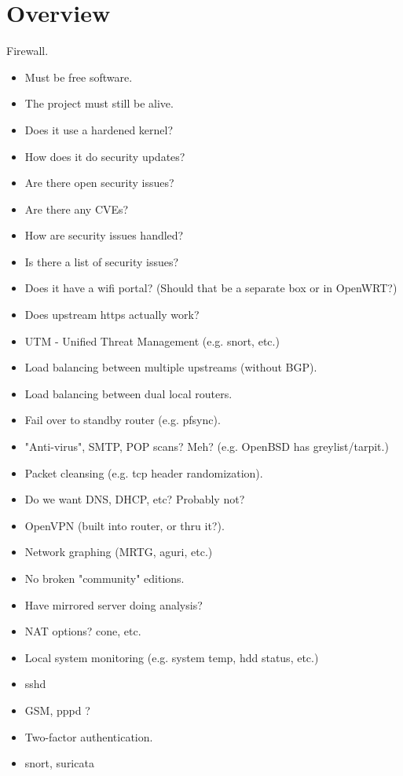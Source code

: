 %
%
%
%
%

\section{Overview}
Firewall.

\begin{itemize}
 \item Must be free software.
 \item The project must still be alive.
 \item Does it use a hardened kernel?
 \item How does it do security updates?
 \item Are there open security issues?
 \item Are there any CVEs?
 \item How are security issues handled?
 \item Is there a list of security issues?
 \item Does it have a wifi portal? (Should that be a separate box or in OpenWRT?)
 \item Does upstream https actually work?
 \item UTM - Unified Threat Management (e.g. snort, etc.)
 \item Load balancing between multiple upstreams (without BGP).
 \item Load balancing between dual local routers.
 \item Fail over to standby router (e.g. pfsync).
 \item "Anti-virus", SMTP, POP scans? Meh? (e.g. OpenBSD has greylist/tarpit.)
 \item Packet cleansing (e.g. tcp header randomization).
 \item Do we want DNS, DHCP, etc? Probably not?
 \item OpenVPN (built into router, or thru it?).
 \item Network graphing (MRTG, aguri, etc.)
 \item No broken "community" editions.
 \item Have mirrored server doing analysis?
 \item NAT options? cone, etc.
 \item Local system monitoring (e.g. system temp, hdd status, etc.)
 \item sshd
 \item GSM, pppd ?
 \item Two-factor authentication.
 \item snort, suricata
\end{itemize}

